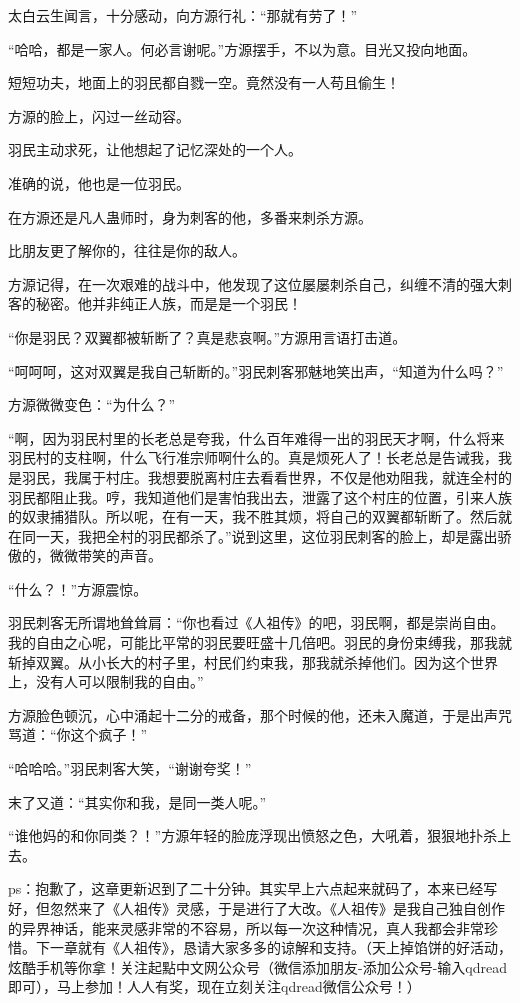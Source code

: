 \begin{this_body}
太白云生闻言，十分感动，向方源行礼：“那就有劳了！”

“哈哈，都是一家人。何必言谢呢。”方源摆手，不以为意。目光又投向地面。

短短功夫，地面上的羽民都自戮一空。竟然没有一人苟且偷生！

方源的脸上，闪过一丝动容。

羽民主动求死，让他想起了记忆深处的一个人。

准确的说，他也是一位羽民。

在方源还是凡人蛊师时，身为刺客的他，多番来刺杀方源。

比朋友更了解你的，往往是你的敌人。

方源记得，在一次艰难的战斗中，他发现了这位屡屡刺杀自己，纠缠不清的强大刺客的秘密。他并非纯正人族，而是是一个羽民！

“你是羽民？双翼都被斩断了？真是悲哀啊。”方源用言语打击道。

“呵呵呵，这对双翼是我自己斩断的。”羽民刺客邪魅地笑出声，“知道为什么吗？”

方源微微变色：“为什么？”

“啊，因为羽民村里的长老总是夸我，什么百年难得一出的羽民天才啊，什么将来羽民村的支柱啊，什么飞行准宗师啊什么的。真是烦死人了！长老总是告诫我，我是羽民，我属于村庄。我想要脱离村庄去看看世界，不仅是他劝阻我，就连全村的羽民都阻止我。哼，我知道他们是害怕我出去，泄露了这个村庄的位置，引来人族的奴隶捕猎队。所以呢，在有一天，我不胜其烦，将自己的双翼都斩断了。然后就在同一天，我把全村的羽民都杀了。”说到这里，这位羽民刺客的脸上，却是露出骄傲的，微微带笑的声音。

“什么？！”方源震惊。

羽民刺客无所谓地耸耸肩：“你也看过《人祖传》的吧，羽民啊，都是崇尚自由。我的自由之心呢，可能比平常的羽民要旺盛十几倍吧。羽民的身份束缚我，那我就斩掉双翼。从小长大的村子里，村民们约束我，那我就杀掉他们。因为这个世界上，没有人可以限制我的自由。”

方源脸色顿沉，心中涌起十二分的戒备，那个时候的他，还未入魔道，于是出声咒骂道：“你这个疯子！”

“哈哈哈。”羽民刺客大笑，“谢谢夸奖！”

末了又道：“其实你和我，是同一类人呢。”

“谁他妈的和你同类？！”方源年轻的脸庞浮现出愤怒之色，大吼着，狠狠地扑杀上去。

ps：抱歉了，这章更新迟到了二十分钟。其实早上六点起来就码了，本来已经写好，但忽然来了《人祖传》灵感，于是进行了大改。《人祖传》是我自己独自创作的异界神话，能来灵感非常的不容易，所以每一次这种情况，真人我都会非常珍惜。下一章就有《人祖传》，恳请大家多多的谅解和支持。（天上掉馅饼的好活动，炫酷手机等你拿！关注起點中文网公众号（微信添加朋友-添加公众号-输入qdread即可），马上参加！人人有奖，现在立刻关注qdread微信公众号！）

\end{this_body}

